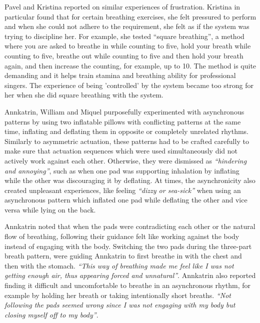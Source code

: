 Pavel and Kristina reported on similar experiences of frustration. Kristina in particular found that for certain breathing exercises, she felt pressured to perform and when she could not adhere to the requirement, she felt as if the system was trying to discipline her. For example, she tested ``square breathing'', a method where you are asked to breathe in while counting to five, hold your breath while counting to five, breathe out while counting to five and then hold your breath again, and then increase the counting, for example, up to 10. The method is quite demanding and it helps train stamina and breathing ability for professional singers. The experience of being 'controlled' by the system became too strong for her when she did square breathing with the system.

Annkatrin, William and Miquel purposefully experimented with asynchronous patterns by using two inflatable pillows with conflicting patterns at the same time, inflating and deflating them in opposite or completely unrelated rhythms. Similarly to asymmetric actuation, these patterns had to be crafted carefully to make sure that actuation sequences which were used simultaneously did not actively work against each other. Otherwise, they were dismissed as \textit{``hindering and annoying''}, such as when one pad was supporting inhalation by inflating while the other was discouraging it by deflating. At times, the asynchronicity also created unpleasant experiences, like feeling \textit{``dizzy or sea-sick''} when using an asynchronous pattern which inflated one pad while deflating the other and vice versa while lying on the back.

Annkatrin noted that when the pads were contradicting each other or the natural flow of breathing, following their guidance felt like working against the body instead of engaging with the body. Switching the two pads during the three-part breath pattern, were guiding Annkatrin to first breathe in with the chest and then with the stomach. \textit{``This way of breathing made me feel like I was not getting enough air, thus appearing forced and unnatural''}. Annkatrin also reported finding it difficult and uncomfortable to breathe in an asynchronous rhythm, for example by holding her breath or taking intentionally short breaths. \textit{``Not following the pads seemed wrong since I was not engaging with my body but closing myself off to my body''}.

